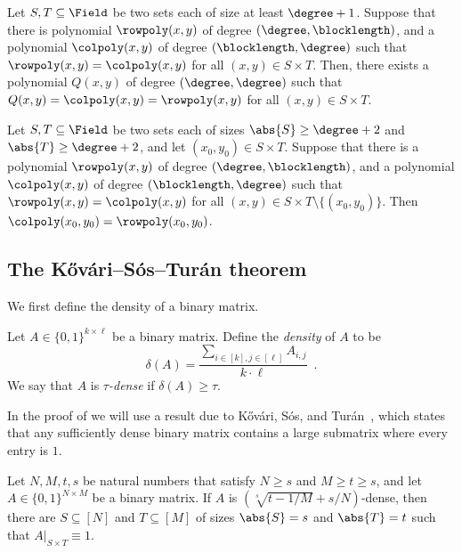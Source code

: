 \documentclass{toc}
\theoremstyle{plain}
\begin{document}
\begin{lemma}\label{lemma:interpolation}
    Let $S,T \subseteq \Field$ be two sets each of size at least $\degree+1$.
    Suppose that there is polynomial $\rowpoly(x,y)$ of degree $(\degree, \blocklength)$,
    and a polynomial $\colpoly(x,y)$ of degree $(\blocklength,\degree)$ such that
    $\rowpoly(x,y) = \colpoly(x,y)$ for all $(x,y) \in S \times T$.
    Then, there exists a polynomial $Q(x,y)$ of degree $(\degree,\degree)$
    such that $Q(x,y) = \colpoly(x,y) = \rowpoly(x,y)$ for all $(x,y) \in S \times T$.
\end{lemma}

\begin{corollary}\label{cor:completing boxes}
    Let $S,T \subseteq \Field$ be two sets each of sizes $\abs{S} \geq \degree+2$ and $\abs{T} \geq \degree+2$,
    and let $(x_0,y_0) \in S \times T$.
    Suppose that there is a polynomial $\rowpoly(x,y)$ of degree $(\degree,\blocklength)$,
    and a polynomial $\colpoly(x,y)$ of degree $(\blocklength,\degree)$ such that
    $\rowpoly(x,y) = \colpoly(x,y)$ for all $(x,y) \in S \times T \setminus \{(x_0,y_0)\}$.
    Then $\colpoly(x_0,y_0) = \rowpoly(x_0,y_0)$.
\end{corollary}

%
\subsection{The \texorpdfstring{K\H{o}v\'{a}ri}{Kovari}--S\'{o}s--Tur\'{a}n theorem} %

We first define the density of a binary matrix.
\begin{definition}
    Let $A \in \{0,1\}^{k \times \ell}$ be a binary matrix.
    Define the \emph{density} of $A$ to be
    \[
      \delta(A) = \frac{\sum_{i \in [k], j \in [\ell]} A_{i,j}}{k \cdot \ell}\enspace.
    \]
    We say that $A$ is \emph{$\tau$-dense} if $\delta(A) \geq \tau$.
\end{definition}

In the proof of 
we will use a result due to
%
K\H{o}v\'{a}ri,     %
S\'{o}s, and Tur\'{a}n~\cite{KovariST54},
which states that any sufficiently dense binary matrix contains a large
submatrix where every entry is $1$.

%
\begin{theorem}[K\H{o}v\'{a}ri, S\'{o}s, Tur\'{a}n]\label{thm:KST}  %
Let $N, M, t, s$ be natural numbers that satisfy $N \ge s$ and $M \ge t \ge s$,
and let $A \in \{0,1\}^{N \times M}$ be a binary matrix.
If $A$ is $(\sqrt[s]{{t-1}/{M}} + {s}/{N})$-dense, then
there are $S \subseteq [N]$ and $T \subseteq [M]$ of sizes $\abs{S} = s$ and $\abs{T}=t$
such that $A \vert_{S \times T} \equiv 1$.
\end{theorem}
\end{document}
